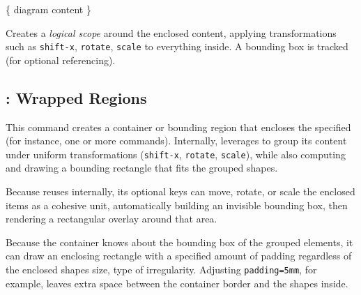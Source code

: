 \documentclass[show-experimental]{l3doc}
\begin{document}
\begin{function}{\nskGroup}
	\begin{syntax}
		  \{ diagram content \}
	\end{syntax}
	Creates a \emph{logical scope} around the enclosed content, applying
	transformations such as \verb|shift-x|, \verb|rotate|, \verb|scale| to
	everything inside. A bounding box is tracked (for optional referencing).
\end{function}

\begin{nskexample}[sidebyside, righthand width=4.5cm]
	\begin{nskFigure}[center]
		\nskGroup[rotate=45]
		{
			\nskBlock[
				fill=nskMainAccent,
				text-center={Block A}
			]
			\nskBlock[
				x=2, y=0,
				fill=nskSecondaryAccent,
				text-center={Block B}
			]
		}
	\end{nskFigure}
\end{nskexample}

\subsection{\texorpdfstring{}{}: Wrapped Regions}

\begin{function}{\nskContainer}
	\begin{syntax}
		  \Arg{\textit{content}}
	\end{syntax}
	This command creates a container or bounding region that encloses the
	specified  (for instance, one or more  commands).
	Internally,  leverages  to group its content
	under uniform transformations (\verb|shift-x|, \verb|rotate|, \verb|scale|),
	while also computing and drawing a bounding rectangle that fits the grouped
	shapes.

	\begin{texnote}
		Because  reuses  internally, its optional keys
		can move, rotate, or scale the enclosed items as a cohesive unit,
		automatically building an invisible bounding box, then rendering
		a rectangular overlay around that area.
	\end{texnote}
\end{function}

Because the container knows about the bounding box of the grouped elements, it can draw an enclosing rectangle with a specified amount of padding regardless of the enclosed shapes size, type of irregularity. Adjusting \verb|padding=5mm|, for example, leaves extra space between the container border and the shapes inside.
\end{document}
